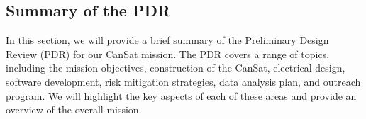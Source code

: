 
\subsection{Summary of the PDR}
In this section, we will provide a brief summary of the Preliminary Design Review (PDR) for our CanSat mission. The PDR covers a range of topics, including the mission objectives, construction of the CanSat, electrical design, software development, risk mitigation strategies, data analysis plan, and outreach program. We will highlight the key aspects of each of these areas and provide an overview of the overall mission.

